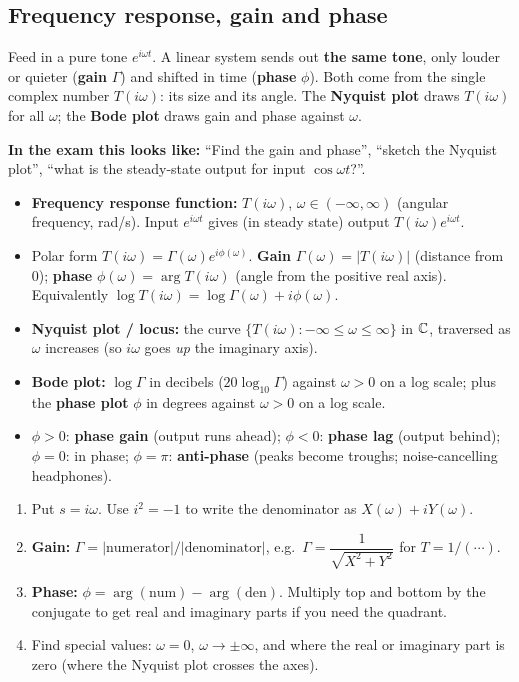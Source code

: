 \subsection{Frequency response, gain and phase \texorpdfstring{}{}}\label{sec:freq}\label{ss:4-2}
\begin{plainbox}
Feed in a pure tone $e^{i\omega t}$. A linear system sends out \textbf{the same tone}, only louder or quieter (\textbf{gain} $\Gamma$)
and shifted in time (\textbf{phase} $\phi$). Both come from the single complex number $T(i\omega)$: its size and its angle.
The \textbf{Nyquist plot} draws $T(i\omega)$ for all $\omega$; the \textbf{Bode plot} draws gain and phase against $\omega$.
\par\smallskip\textbf{In the exam this looks like:} ``Find the gain and phase'', ``sketch the Nyquist plot'', ``what is the steady-state output for input $\cos\omega t$?''.
\end{plainbox}
\begin{defbox}
\begin{itemize}
\item \textbf{Frequency response function:} $T(i\omega)$, $\omega\in(-\infty,\infty)$ (angular frequency, rad/s). Input $e^{i\omega t}$ gives (in steady state) output $T(i\omega)e^{i\omega t}$.
\item Polar form $T(i\omega)=\Gamma(\omega)e^{i\phi(\omega)}$. \textbf{Gain} $\Gamma(\omega)=|T(i\omega)|$ (distance from $0$); \textbf{phase} $\phi(\omega)=\arg T(i\omega)$ (angle from the positive real axis). Equivalently $\log T(i\omega)=\log\Gamma(\omega)+i\phi(\omega)$.
\item \textbf{Nyquist plot / locus:} the curve $\{T(i\omega):-\infty\le\omega\le\infty\}$ in $\mathbb{C}$, traversed as $\omega$ increases (so $i\omega$ goes \emph{up} the imaginary axis).
\item \textbf{Bode plot:} $\log\Gamma$ in decibels ($20\log_{10}\Gamma$) against $\omega>0$ on a log scale; plus the \textbf{phase plot} $\phi$ in degrees against $\omega>0$ on a log scale.
\item $\phi>0$: \textbf{phase gain} (output runs ahead); $\phi<0$: \textbf{phase lag} (output behind); $\phi=0$: in phase; $\phi=\pi$: \textbf{anti-phase} (peaks become troughs; noise-cancelling headphones).
\end{itemize}
\end{defbox}
\begin{methodbox}[title={Method: gain and phase}]
\begin{enumerate}
\item Put $s=i\omega$. Use $i^2=-1$ to write the denominator as $X(\omega)+iY(\omega)$.
\item \textbf{Gain:} $\Gamma=|\text{numerator}|/|\text{denominator}|$, e.g.\ $\Gamma=\dfrac{1}{\sqrt{X^2+Y^2}}$ for $T=1/(\cdots)$.
\item \textbf{Phase:} $\phi=\arg(\text{num})-\arg(\text{den})$. Multiply top and bottom by the conjugate to get real and imaginary parts if you need the quadrant.
\item Find special values: $\omega=0$, $\omega\to\pm\infty$, and where the real or imaginary part is zero (where the Nyquist plot crosses the axes).
\end{enumerate}
\end{methodbox}
